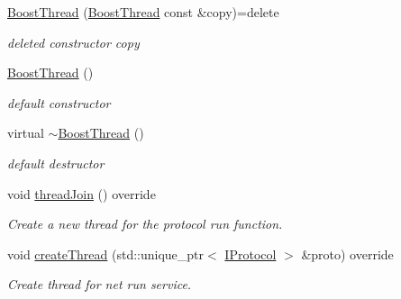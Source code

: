 \begin{DoxyCompactItemize}
\item 
\mbox{\label{classspider_1_1_boost_thread_a8e59e8b72a811cf9bed0897b42aa5dc0}} 
\hyperlink{classspider_1_1_boost_thread_a8e59e8b72a811cf9bed0897b42aa5dc0}{Boost\+Thread} (\hyperlink{classspider_1_1_boost_thread}{Boost\+Thread} const \&copy)=delete
\begin{DoxyCompactList}\small\item\em deleted constructor copy \end{DoxyCompactList}\item 
\mbox{\label{classspider_1_1_boost_thread_ac28d20f3dec646f5e0fa1b1867301f23}} 
\hyperlink{classspider_1_1_boost_thread_ac28d20f3dec646f5e0fa1b1867301f23}{Boost\+Thread} ()
\begin{DoxyCompactList}\small\item\em default constructor \end{DoxyCompactList}\item 
\mbox{\label{classspider_1_1_boost_thread_a5ceccd1f624004656dd5fedb1feba203}} 
virtual \hyperlink{classspider_1_1_boost_thread_a5ceccd1f624004656dd5fedb1feba203}{$\sim$\+Boost\+Thread} ()
\begin{DoxyCompactList}\small\item\em default destructor \end{DoxyCompactList}\item 
\mbox{\label{classspider_1_1_boost_thread_a84d119a94f3c4bb4ec769cab74fdf238}} 
void \hyperlink{classspider_1_1_boost_thread_a84d119a94f3c4bb4ec769cab74fdf238}{thread\+Join} () override
\begin{DoxyCompactList}\small\item\em Create a new thread for the protocol run function. \end{DoxyCompactList}\item 
\mbox{\label{classspider_1_1_boost_thread_abf68f16932d67d6d9076b17bbd1c9d31}} 
void \hyperlink{classspider_1_1_boost_thread_abf68f16932d67d6d9076b17bbd1c9d31}{create\+Thread} (std\+::unique\+\_\+ptr$<$ \hyperlink{classspider_1_1_i_protocol}{I\+Protocol} $>$ \&proto) override
\begin{DoxyCompactList}\small\item\em Create thread for net run service. \end{DoxyCompactList}\item 

\end{DoxyCompactItemize}
